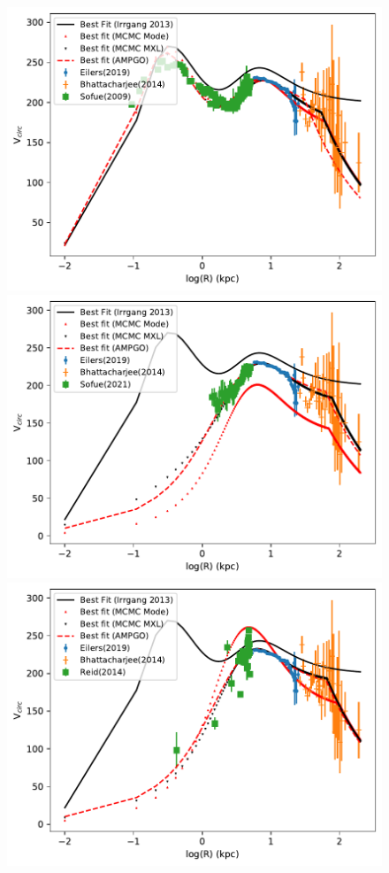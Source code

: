 \documentclass[fleqn,usenatbib]{mnras}
\begin{document}
\begin{figure}
\includegraphics[width=\columnwidth]{Model_I/Plots/Sofue(2009)/Rotcur_ModelI_eil_bhatta_log_10000_100.pdf}
\includegraphics[width=\columnwidth]{Model_I/Plots/Sofue(2021)/Rotcur_ModelI_eil_bhatta_log_10000_100.pdf}
\includegraphics[width=\columnwidth]{Model_I/Plots/Reid(2014)/Rotcur_ModelI_eil_bhatta_log_10000_100.pdf}

\end{figure}
\end{document}
